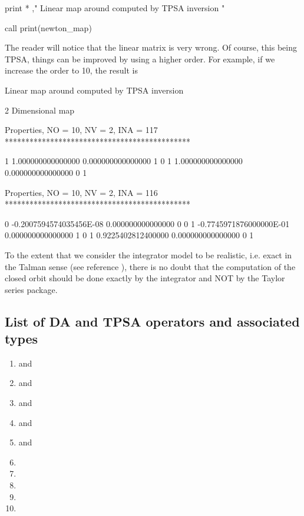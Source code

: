 \documentclass[english,12pt,article]{article} %
\begin{document}
{{{\begin{example2}
 print * ," Linear map around computed by TPSA inversion " 

call print(newton_map)
\end{example2}

The reader will notice that the linear matrix is very wrong. Of course, this being TPSA, things can be improved by using a higher order. For example, if we increase the order to 10, the result is 


\begin{example2}
  Linear map around computed by TPSA inversion

           2  Dimensional map

 Properties, NO =   10, NV =    2, INA =  117
 *********************************************

   1   1.000000000000000       0.000000000000000       1  0
   1   1.000000000000000       0.000000000000000       0  1


 Properties, NO =   10, NV =    2, INA =  116
 *********************************************

   0 -0.2007594574035456E-08   0.000000000000000       0  0
   1 -0.7745971876000000E-01   0.000000000000000       1  0
   1  0.9225402812400000       0.000000000000000       0  1
\end{example2}

To the extent that we consider the integrator model to be realistic, i.e. exact in the Talman sense (see reference \cite{forestreview} ), there is no doubt that the computation of the closed orbit should be done exactly by the integrator and NOT by the Taylor series package.

\subsection{List of  DA and TPSA operators and associated types} \label{sec:opeda}




\begin{enumerate}
\item  {} and  
\item  {} and  
\item {} and  
\item {} and  
\item {} and  
\item {}
\item {} 
\item {} 
\item {} 
\item {} 
\end{enumerate}

}}}
\end{document}
